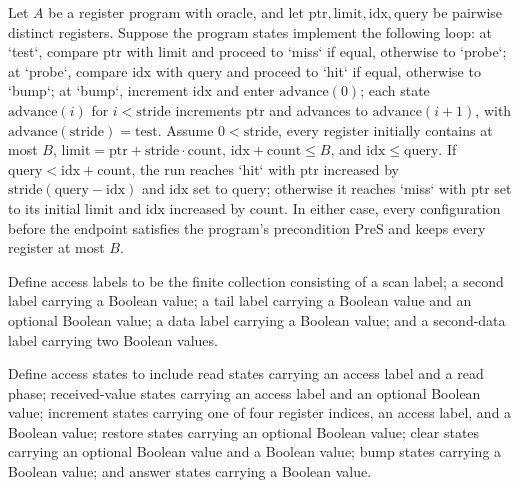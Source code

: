 \begin{theorem}
\label{Complexity.LogProg.indexedSeek_loop}
\leanok
{}
Let $A$ be a register program with oracle, and let
$\mathrm{ptr},\mathrm{limit},\mathrm{idx},\mathrm{query}$ be pairwise distinct
registers. Suppose the program states implement the following loop: at `test`, compare
$\mathrm{ptr}$ with $\mathrm{limit}$ and proceed to `miss` if equal, otherwise to
`probe`; at `probe`, compare $\mathrm{idx}$ with $\mathrm{query}$ and proceed to `hit`
if equal, otherwise to `bump`; at `bump`, increment $\mathrm{idx}$ and enter
$\mathrm{advance}(0)$; each state $\mathrm{advance}(i)$ for $i<\mathrm{stride}$
increments $\mathrm{ptr}$ and advances to $\mathrm{advance}(i+1)$, with
$\mathrm{advance}(\mathrm{stride})=\mathrm{test}$. Assume $0<\mathrm{stride}$, every
register initially contains at most $B$,
$\mathrm{limit}=\mathrm{ptr}+\mathrm{stride}\cdot\mathrm{count}$,
$\mathrm{idx}+\mathrm{count}\le B$, and $\mathrm{idx}\le\mathrm{query}$. If
$\mathrm{query}<\mathrm{idx}+\mathrm{count}$, the run reaches `hit` with $\mathrm{ptr}$
increased by $\mathrm{stride}(\mathrm{query}-\mathrm{idx})$ and $\mathrm{idx}$ set to
$\mathrm{query}$; otherwise it reaches `miss` with $\mathrm{ptr}$ set to its initial
$\mathrm{limit}$ and $\mathrm{idx}$ increased by $\mathrm{count}$. In either case, every
configuration before the endpoint satisfies the program's precondition $\mathrm{PreS}$
and keeps every register at most $B$.
\end{theorem}

\begin{definition}
\label{Complexity.LogProg.AccessLabel}
\leanok
Define access labels to be the finite collection consisting of a scan label; a second
label carrying a Boolean value; a tail label carrying a Boolean value and an optional
Boolean value; a data label carrying a Boolean value; and a second-data label carrying
two Boolean values.
\end{definition}

\begin{definition}
\label{Complexity.LogProg.AccessState}
\leanok
{}
Define access states to include read states carrying an access label and a read phase;
received-value states carrying an access label and an optional Boolean value; increment
states carrying one of four register indices, an access label, and a Boolean value;
restore states carrying an optional Boolean value; clear states carrying an optional
Boolean value and a Boolean value; bump states carrying a Boolean value; and answer
states carrying a Boolean value.
\end{definition}

